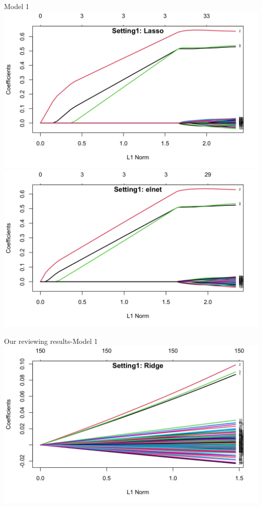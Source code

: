 \documentclass{beamer}
\begin{document}
\begin{frame}{Model 1}
    \centering \includegraphics[scale=0.13]{1.4.png}
     \includegraphics[scale=0.13]{1.2.png}
\end{frame}
\begin{frame}{Our reviewing results-Model 1}
    \centering \includegraphics[scale=0.15]{1.1.png}
\end{frame}
\end{document}
